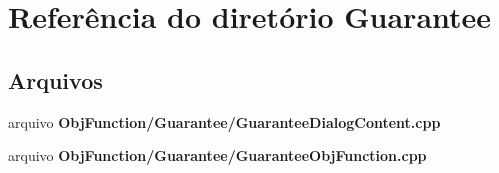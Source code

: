 \section{Referência do diretório Guarantee}
\label{dir_bb87124e5f40ace2ba9230d0735d92b6}
\subsection*{Arquivos}
\begin{DoxyCompactItemize}
\item 
arquivo {\bf Obj\+Function/\+Guarantee/\+Guarantee\+Dialog\+Content.\+cpp}
\item 
arquivo {\bf Obj\+Function/\+Guarantee/\+Guarantee\+Obj\+Function.\+cpp}
\end{DoxyCompactItemize}
